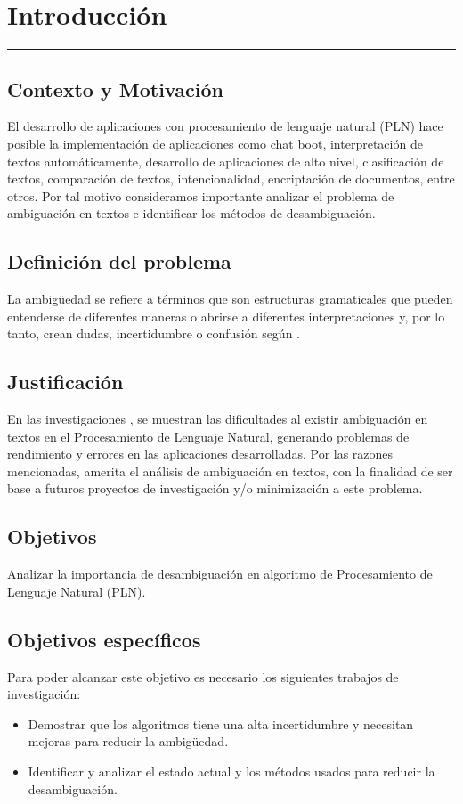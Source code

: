 \chapter{Introducción}
\hrule \bigskip \vspace*{1cm}
\section{Contexto y Motivación}
El desarrollo de aplicaciones con procesamiento de lenguaje natural (PLN) hace posible la implementación de aplicaciones como chat boot, interpretación de textos automáticamente, desarrollo de aplicaciones de alto nivel, clasificación de textos, comparación de textos, intencionalidad, encriptación de documentos, entre otros. Por tal motivo consideramos importante analizar el problema de ambiguación en textos e identificar los métodos de desambiguación. 

\section{Definición del problema}
La ambigüedad se refiere a términos que son estructuras gramaticales que pueden entenderse de diferentes maneras o abrirse a diferentes interpretaciones y, por lo tanto, crean dudas, incertidumbre o confusión según \cite{EvaluacionAmbiguedad01}.

\section{Justificación}
En las investigaciones \cite{ChatBoot}, \cite{055}se muestran las dificultades al existir ambiguación en textos en el Procesamiento de Lenguaje Natural, generando problemas de rendimiento y errores en las aplicaciones desarrolladas. Por las razones mencionadas, amerita el análisis de ambiguación en textos, con la finalidad de ser base a futuros proyectos de investigación y/o minimización a este problema. 

\section{Objetivos}

 Analizar la importancia de desambiguación en algoritmo de Procesamiento de Lenguaje Natural (PLN).

\section{Objetivos específicos}
Para poder alcanzar este objetivo es necesario los siguientes trabajos de investigación:
\begin{itemize}
  \item Demostrar que los algoritmos tiene una alta incertidumbre y necesitan mejoras para reducir la ambigüedad.
  \item Identificar y analizar el estado actual y los métodos usados para reducir la desambiguación.
\end{itemize}

